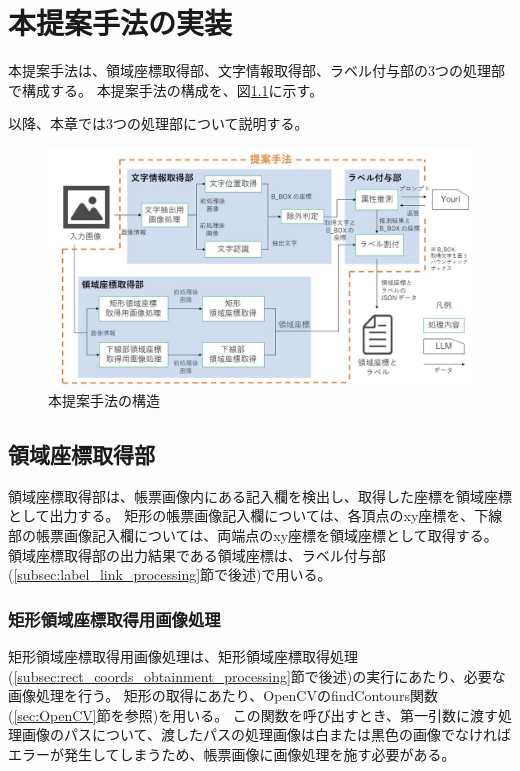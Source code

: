 \chapter{本提案手法の実装}\label{cha:Implementation}
本提案手法は、領域座標取得部、文字情報取得部、ラベル付与部の3つの処理部で構成する。
本提案手法の構成を、図\ref{fig:structure}に示す。

以降、本章では3つの処理部について説明する。

\begin{figure}[t]
    \begin{center}
        \includegraphics[width=15cm]{image/structure.jpg}
        \caption{本提案手法の構造}
        \label{fig:structure}
    \end{center}
\end{figure}


\section{領域座標取得部}\label{sec:area_coords_obtainment_part}
領域座標取得部は、帳票画像内にある記入欄を検出し、取得した座標を領域座標として出力する。
矩形の帳票画像記入欄については、各頂点のxy座標を、下線部の帳票画像記入欄については、両端点のxy座標を領域座標として取得する。
領域座標取得部の出力結果である領域座標は、ラベル付与部(\ref{subsec:label_link_processing}節で後述)で用いる。

\subsection{矩形領域座標取得用画像処理}\label{subsec:image_processing_for_rect_coords_obtainment}
矩形領域座標取得用画像処理は、矩形領域座標取得処理(\ref{subsec:rect_coords_obtainment_processing}節で後述)の実行にあたり、必要な画像処理を行う。
矩形の取得にあたり、OpenCVのfindContours関数(\ref{sec:OpenCV}節を参照)を用いる。
この関数を呼び出すとき、第一引数に渡す処理画像のパスについて、渡したパスの処理画像は白または黒色の画像でなければエラーが発生してしまうため、帳票画像に画像処理を施す必要がある。


